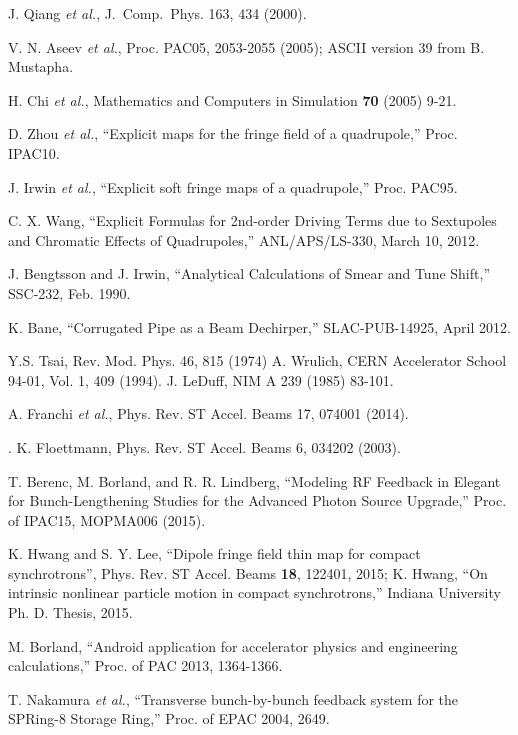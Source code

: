 \documentclass[11pt]{article}
\begin{document}
\begin{thebibliography}{99}
J. Qiang {\em et al.},  J.~Comp.~Phys. 163, 434 (2000).

  V. N. Aseev {\em et al.}, Proc. PAC05, 2053-2055 (2005); ASCII version 39 from B. Mustapha.

  H. Chi {\em et al.}, Mathematics and Computers in Simulation {\bf 70} (2005) 9-21.

  D. Zhou {\em et al.}, ``Explicit maps for the fringe field of a quadrupole,'' Proc. IPAC10.

  J. Irwin {\em et al.}, ``Explicit soft fringe maps of a quadrupole,'' Proc. PAC95.

  C. X. Wang, ``Explicit Formulas for 2nd-order Driving Terms due to Sextupoles and Chromatic Effects of Quadrupoles,''
  ANL/APS/LS-330, March 10, 2012.

  J. Bengtsson and J. Irwin, ``Analytical Calculations of Smear and Tune Shift,'' SSC-232, Feb. 1990.

 K. Bane, ``Corrugated Pipe as a Beam Dechirper,'' SLAC-PUB-14925, April 2012.

 Y.S. Tsai, Rev. Mod. Phys. 46, 815 (1974)
 A. Wrulich, CERN Accelerator School 94-01, Vol. 1, 409 (1994).
 J. LeDuff, NIM A 239 (1985) 83-101.

 A. Franchi {\em et al.}, Phys. Rev. ST Accel. Beams 17, 074001 (2014).

.
 K. Floettmann, Phys. Rev. ST Accel. Beams 6, 034202 (2003).

 T. Berenc, M. Borland, and R. R. Lindberg, ``Modeling RF Feedback in Elegant for Bunch-Lengthening Studies for the Advanced Photon Source Upgrade,''
 Proc. of IPAC15, MOPMA006 (2015).

  K. Hwang and S. Y. Lee, ``Dipole fringe field thin map for compact synchrotrons'', Phys. Rev. ST Accel. Beams {\bf 18}, 122401, 2015; K. Hwang, ``On intrinsic nonlinear particle 
  motion in compact synchrotrons,'' Indiana University Ph. D. Thesis, 2015.

  M. Borland, ``Android application for accelerator physics and engineering calculations,'' Proc. of PAC 2013, 1364-1366.

  T. Nakamura {\em et al.}, ``Transverse bunch-by-bunch feedback system for the SPRing-8 Storage Ring,'' Proc. of EPAC 2004, 2649.


\end{thebibliography}
\end{document}
